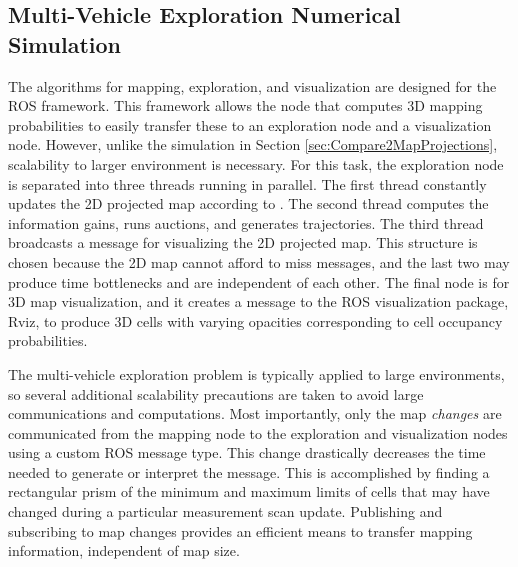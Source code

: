 \subsection{Multi-Vehicle Exploration Numerical Simulation}
\label{sec:MultivehicleExplorationSEH}


The algorithms for mapping, exploration, and visualization are designed for the ROS framework. This framework allows the node that computes 3D mapping probabilities to easily transfer these to an exploration node and a visualization node. However, unlike the simulation in Section \ref{sec:Compare2MapProjections}, scalability to larger environment is necessary. For this task, the exploration node is separated into three threads running in parallel. The first thread constantly updates the 2D projected map according to . The second thread computes the information gains, runs auctions, and generates trajectories. The third thread broadcasts a message for visualizing the 2D projected map. This structure is chosen because the 2D map cannot afford to miss messages, and the last two may produce time bottlenecks and are independent of each other. The final node is for 3D map visualization, and it creates a message to the ROS visualization package, Rviz, to produce 3D cells with varying opacities corresponding to cell occupancy probabilities.

The multi-vehicle exploration problem is typically applied to large environments, so several additional scalability precautions are taken to avoid large communications and computations. Most importantly, only the map \emph{changes} are communicated from the mapping node to the exploration and visualization nodes using a custom ROS message type. This change drastically decreases the time needed to generate or interpret the message. This is accomplished by finding a rectangular prism of the minimum and maximum limits of cells that may have changed during a particular measurement scan update. Publishing and subscribing to map changes provides an efficient means to transfer mapping information, independent of map size.


